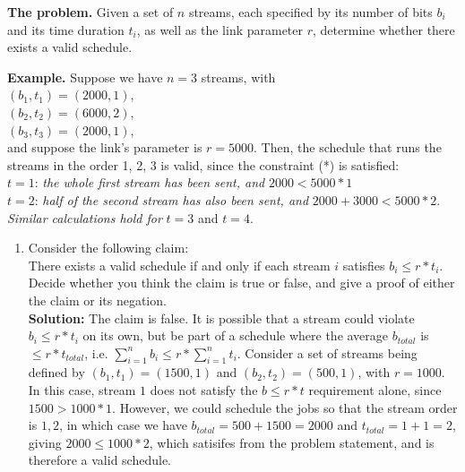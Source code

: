 \documentclass[11pts]{article}
\begin{document}
\begin{enumerate}
\textbf{The problem.} Given a set of $n$ streams, each specified
by its number of bits $b_i$ and its time duration $t_i$, as well as
the link parameter $r$, determine whether there exists a valid 
schedule.

\textbf{Example.} Suppose we have $n = 3$ streams, with \\
 $(b_1, t_1) = (2000, 1)$, \\
$(b_2, t_2) = (6000, 2)$, \\
$(b_3, t_3) = (2000, 1)$, \\
and suppose the link’s parameter is $r = 5000$. Then, the schedule that
runs the streams in the order 1, 2, 3 is valid, since the constraint
(*) is satisfied: \\
$t = 1$: \textit{the whole first stream has been sent, and} $2000 < 5000*1$ \\ 
$t = 2$: \textit{half of the second stream has also been sent,
and} $2000+3000 < 5000*2$. \\
\textit{Similar calculations hold for} $t = 3$ and $t = 4$. \\

  \begin{enumerate}
  \item Consider the following claim: \\
  There exists a valid schedule if and only if each stream $i$ satisfies
  $b_i \le r * t_i$. \\
  Decide whether you think the claim is true or false, and give a proof
  of either the claim or its negation. \\

  \textbf{Solution:} The claim is false. It is possible that a stream could
  violate $b_i \le r * t_i$ on its own, but be part of a schedule where the
  average $b_{total}$ is $\le r * t_{total}$, i.e.
  $\sum_{i=1}^{n}{b_i} \le r*\sum_{i=1}^{n}{t_i}$. Consider a
  set of streams being defined by $(b_1, t_1) = (1500, 1)$ and
  $(b_2, t_2) = (500, 1)$, with $r = 1000$.
  In this case, stream $1$ does not satisfy the $b \le r*t$ requirement alone,
  since $ 1500 > 1000 * 1 $. However, we could schedule the jobs so that the
  stream order is $1, 2$, in which case we have $b_{total} = 500 + 1500 = 2000$
  and $t_{total} = 1 + 1 = 2$, giving $2000 \le 1000 * 2$, which
  satisifes \text{(*)} from the problem statement, and is therefore a valid
  schedule. \\


\end{enumerate}
\end{enumerate}
\end{document}

